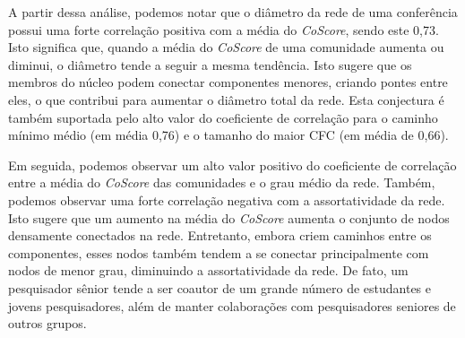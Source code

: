 A partir dessa análise, podemos notar que o diâmetro da rede de uma conferência 
possui uma forte correlação positiva com a média do \textit{CoScore}, sendo este 0,73. Isto significa que, quando a média do
\textit{CoScore} de uma comunidade aumenta ou diminui, o diâmetro tende a seguir a mesma tendência. Isto sugere que os 
membros do núcleo podem conectar componentes menores, criando pontes entre eles, o que contribui para aumentar o diâmetro 
total da rede. Esta conjectura é também suportada pelo alto valor do coeficiente de correlação para o caminho mínimo médio 
(em média 0,76) e o tamanho do maior CFC (em média de 0,66).


Em seguida, podemos observar um alto valor positivo do coeficiente de correlação entre a média do \textit{CoScore}
das comunidades e o grau médio da rede. Também, podemos observar uma forte correlação negativa com a 
assortatividade da rede. Isto sugere que um aumento na média do \textit{CoScore} aumenta o conjunto de nodos densamente 
conectados na rede. Entretanto, embora criem caminhos entre os componentes, esses nodos também tendem a se conectar principalmente com nodos de 
menor grau, diminuindo a assortatividade da rede. De fato, um pesquisador sênior tende a ser coautor 
de um grande número de estudantes e jovens pesquisadores, além de manter colaborações com pesquisadores seniores 
de outros grupos.


